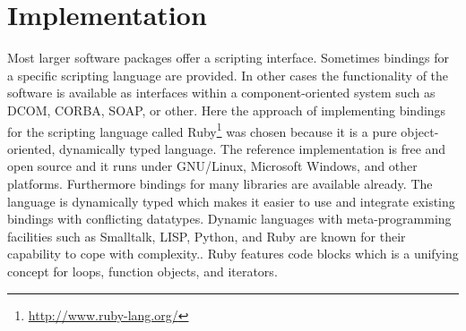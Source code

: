 \documentclass[a4paper,12pt]{book}
\begin{document}
\section{Implementation}
Most larger software packages offer a scripting interface. Sometimes bindings
for a specific scripting language are provided. In other cases the
functionality of the software is available as interfaces within a
component-oriented system such as DCOM, CORBA, SOAP, or other. Here the
approach of implementing bindings for the scripting language called
Ruby\footnote{\url{http://www.ruby-lang.org/}} was chosen
because it is a pure object-oriented, dynamically typed language. The
reference implementation is free and open source and it runs under GNU/Linux,
Microsoft Windows, and other platforms. Furthermore bindings for many
libraries are available already. The language is dynamically typed which makes
it easier to use and integrate existing bindings with conflicting datatypes.
Dynamic languages with meta-programming facilities such as Smalltalk,
LISP, Python, and Ruby are known for their capability to cope with
complexity.\cite{RefWorks:311}. Ruby features code blocks which is a
unifying concept for loops, function objects, and iterators.
\end{document}
